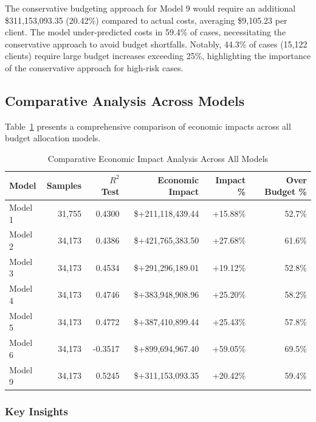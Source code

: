 The conservative budgeting approach for Model 9 would require an additional \$311,153,093.35 (20.42\%) compared to actual costs, averaging \$9,105.23 per client. The model under-predicted costs in 59.4\% of cases, necessitating the conservative approach to avoid budget shortfalls. Notably, 44.3\% of cases (15,122 clients) require large budget increases exceeding 25\%, highlighting the importance of the conservative approach for high-risk cases. 

\clearpage

\subsection{Comparative Analysis Across Models}
\label{subsec:comparative_impact}

Table~\ref{tab:all_models_impact_comparison} presents a comprehensive comparison of economic impacts across all budget allocation models.

\begin{table}[htbp]
\centering
\small
\caption{Comparative Economic Impact Analysis Across All Models}
\label{tab:all_models_impact_comparison}
\begin{tabular}{lrrrrr}
\toprule
\textbf{Model} & \textbf{Samples} & \textbf{$R^2$ Test} & \textbf{Economic Impact} & \textbf{Impact \%} & \textbf{Over Budget \%} \\
\midrule
Model 1 & 31,755 & 0.4300 & \$+211,118,439.44 & +15.88\% & 52.7\% \\
Model 2 & 34,173 & 0.4386 & \$+421,765,383.50 & +27.68\% & 61.6\% \\
Model 3 & 34,173 & 0.4534 & \$+291,296,189.01 & +19.12\% & 52.8\% \\
Model 4 & 34,173 & 0.4746 & \$+383,948,908.96 & +25.20\% & 58.2\% \\
Model 5 & 34,173 & 0.4772 & \$+387,410,899.44 & +25.43\% & 57.8\% \\
Model 6 & 34,173 & -0.3517 & \$+899,694,967.40 & +59.05\% & 69.5\% \\
Model 9 & 34,173 & 0.5245 & \$+311,153,093.35 & +20.42\% & 59.4\% \\
\bottomrule
\end{tabular}
\end{table}

\subsubsection{Key Insights}

